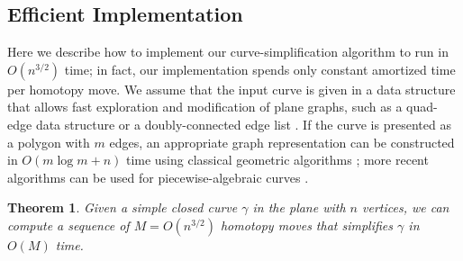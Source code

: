\documentclass[11pt,twoside]{article}
\newtheorem{theorem}{Theorem}[section]
\numberwithin{figure}{section}
\begin{document}
\subsection{Efficient Implementation}

Here we describe how to implement our curve-simplification algorithm to run in $O(n^{3/2})$ time; in fact, our implementation spends only constant amortized time per homotopy move.  We assume that the input curve is given in a data structure that allows fast exploration and modification of plane graphs, such as a quad-edge data structure \cite{gs-pmgsc-85} or a doubly-connected edge list \cite{bcko-cgaa-08}.  If the curve is presented as a polygon with $m$ edges, an appropriate graph representation can be constructed in $O(m\log m + n)$ time using classical geometric algorithms \cite{cs-arscg-89,m-fppa-90,ce-oails-92}; more recent algorithms can be used  for piecewise-algebraic curves \cite{ek-ee2aa-08}.

\begin{theorem}
\label{Th:upper-algo}
Given a simple closed curve $\gamma$ in the plane with $n$ vertices, we can compute a sequence of $M = O(n^{3/2})$ homotopy moves that simplifies $\gamma$ in $O(M)$ time.
\end{theorem}
\end{document}
